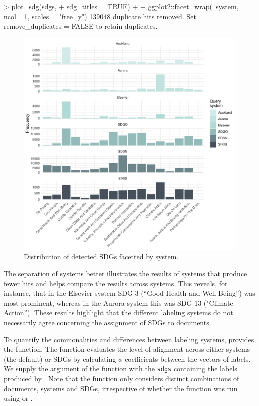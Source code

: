 \begin{example}
> plot_sdg(sdgs, 
+          sdg_titles = TRUE) + 
+   ggplot2::facet_wrap(~system, ncol= 1, scales = "free_y")
139048 duplicate hits removed. Set remove_duplicates = FALSE to retain duplicates.
\end{example}


\begin{figure}[htbp]
  \centering
   \includegraphics[width=1\linewidth]{default_plot_sdg_labels_revision.pdf}
  \caption{Distribution of detected SDGs facetted by system.}
  \label{figure:default_plot_facetted}
\end{figure}

The separation of systems better illustrates the results of systems that produce fewer hits and helps compare the results across systems. This reveals, for instance, that in the Elsevier system SDG 3 (“Good Health and Well-Being”) was most prominent, whereas in the Aurora system this was SDG 13 ("Climate Action”). These results highlight that the different labeling systems do not necessarily agree concerning the assignment of SDGs to documents. 

To quantify the commonalities and differences between labeling systems,  provides the  function. The function evaluates the level of alignment across either systems (the default) or SDGs by calculating $\phi$ coefficients between the vectors of labels. We supply the  argument of the function with the \texttt{sdgs}  containing the labels produced by . Note that the function only considers distinct combinations of documents, systems and SDGs, irrespective of whether the  function was run using  or .    

